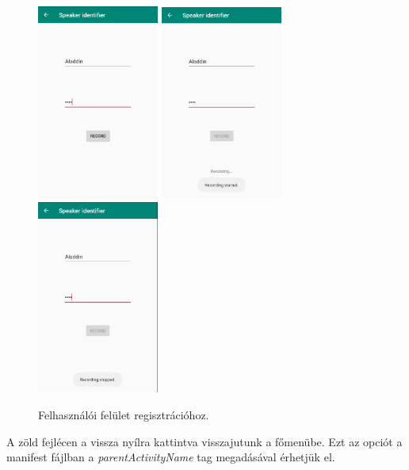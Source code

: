 \begin{figure}[!ht]
	\centering
	\includegraphics[width=40mm, keepaspectratio]{figures/app-register-screen-1.png}
	\includegraphics[width=40mm, keepaspectratio]{figures/app-register-screen-2.png}
	\includegraphics[width=40mm, keepaspectratio]{figures/app-register-screen-3.png}
	\caption{Felhasználói felület regisztrációhoz.}
	\label{fig:app-register-screen-1}
\end{figure}

A zöld fejlécen a vissza nyílra kattintva visszajutunk a főmenübe. Ezt az opciót a manifest fájlban a \emph{parentActivityName} tag megadásával érhetjük el.

